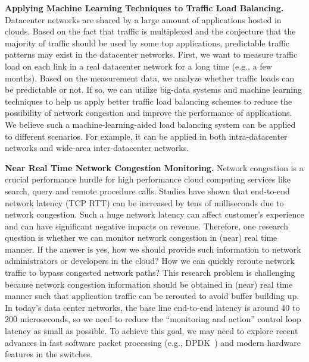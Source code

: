 {\bf Applying Machine Learning Techniques to Traffic Load Balancing.}
Datacenter networks are shared by a large amount of applications hosted in clouds. 
Based on the fact that traffic is multiplexed and the conjecture that the majority of traffic 
should be used by some top applications, predictable traffic patterns may 
exist in the datacenter networks. First, we want to measure traffic load on each link 
in a real datacenter network for a long time (e.g., a few months). Based on the measurement data, 
we analyze whether traffic loads can be predictable or not. If so, we can utilize 
big-data systems and machine learning techniques to help us apply better traffic load 
balancing schemes to reduce the possibility of network congestion and improve the 
performance of applications. We believe such a machine-learning-aided load balancing 
system can be applied to different scenarios. For example, it can be applied in 
both intra-datacenter networks and wide-area inter-datacenter networks.

{\bf Near Real Time Network Congestion Monitoring.}
Network congestion is a crucial performance hurdle for high performance cloud computing services like 
search, query and remote procedure calls.
Studies have shown that end-to-end network latency (TCP RTT) can be increased by tens of milliseconds due to network congestion. Such a huge network latency can affect customer's experience and can have significant negative impacts on revenue.
Therefore, one research question is whether we can monitor network congestion in (near) real time manner.
If the answer is yes, how we should provide such information to network administrators or developers
in the cloud? How we can quickly reroute network traffic to bypass congested network paths?
This research problem is challenging because network congestion information should be obtained in
(near) real time manner such that application traffic can be rerouted to avoid buffer building up.
In today's data center networks, the base line end-to-end latency is around 40 to
200 microseconds, so we need to reduce the ``monitoring and action''
control loop latency as small as possible.
To achieve this goal, we may need to explore recent advances in fast software packet processing 
(e.g., DPDK~\cite{intel-dpdk}) and modern hardware features in the switches.
